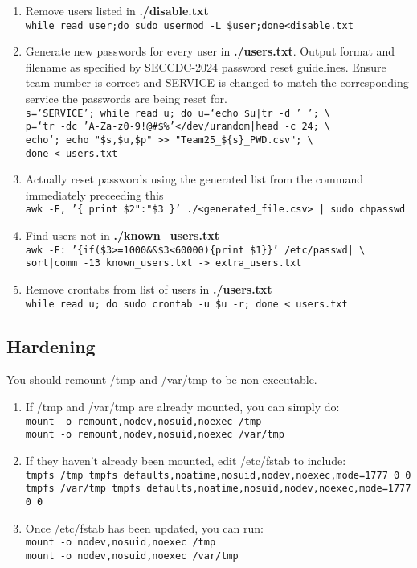 \documentclass[12pt,letterpaper]{article}
\def\code#1{\textcolor{iris}{\texttt{#1}}}
\def\bf#1{\textbf{#1}}
\begin{document}
\begin{enumerate}
	\item Remove users listed in \bf{./disable.txt} \\
		\code{while read user;do sudo usermod -L \$user;done<disable.txt}
	\item Generate new passwords for every user in \bf{./users.txt}. Output format and filename as specified by SECCDC-2024 password reset guidelines. Ensure team number is correct and SERVICE is changed to match the corresponding service the passwords are being reset for. \\
		\code{s='SERVICE'; while read u; do u=`echo \$u|tr -d ' '; \textbackslash\\
		p=`tr -dc 'A-Za-z0-9!@\#\$\%'</dev/urandom|head -c 24; \textbackslash\\
		echo`; echo "\$s,\$u,\$p" >> "Team25\_\$\{s\}\_PWD.csv"; \textbackslash\\
		done < users.txt}
	\item Actually reset passwords using the generated list from the command immediately preceeding this \\
		\code{awk -F, '\{ print \$2":"\$3 \}' ./<generated\_file.csv> | sudo chpasswd}
	\item Find users not in \bf{./known\_users.txt} \\
		\code{awk -F: '\{if(\$3>{}=1000\&\&\$3<60000)\{print \$1\}\}' /etc/passwd| \textbackslash \\
		sort|comm -13
		known\_users.txt -> extra\_users.txt}
	\item Remove crontabs from list of users in \bf{./users.txt} \\
		\code{while read u; do sudo crontab -u \$u -r; done < users.txt}
\end{enumerate}

\subsection{Hardening}

You should remount /tmp and /var/tmp to be non-executable.
\begin{enumerate}
	\item If /tmp and /var/tmp are already mounted, you can simply do: \code{ \\
		mount -o remount,nodev,nosuid,noexec /tmp \\
		mount -o remount,nodev,nosuid,noexec /var/tmp }
	\item If they haven't already been mounted, edit /etc/fstab to include: \code{ \\
		tmpfs /tmp tmpfs defaults,noatime,nosuid,nodev,noexec,mode=1777 0 0 \\
		tmpfs /var/tmp tmpfs defaults,noatime,nosuid,nodev,noexec,mode=1777 0 0 }
	\item Once /etc/fstab has been updated, you can run: \code{ \\
		mount -o nodev,nosuid,noexec /tmp \\
		mount -o nodev,nosuid,noexec /var/tmp }
\end{enumerate}
\end{document}

